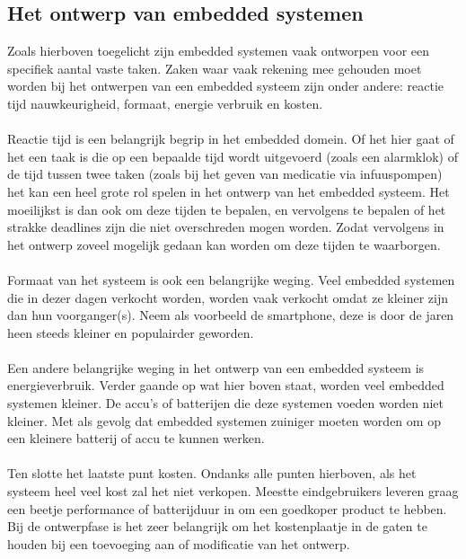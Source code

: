 \documentclass[../DCM2_Verslag.tex]{subfiles}
\begin{document}
\subsection{Het ontwerp van embedded systemen}
Zoals hierboven toegelicht zijn embedded systemen vaak ontworpen voor een specifiek aantal vaste taken. Zaken waar vaak rekening mee gehouden moet worden bij het ontwerpen van een embedded systeem zijn onder andere: reactie tijd nauwkeurigheid, formaat, energie verbruik en kosten. 
\\\\
Reactie tijd is een belangrijk begrip in het embedded domein. Of het hier gaat of het een taak is die op een bepaalde tijd wordt uitgevoerd (zoals een alarmklok) of de tijd tussen twee taken (zoals bij het geven van medicatie via infuuspompen) het kan een heel grote rol spelen in het ontwerp van het embedded systeem. Het moeilijkst is dan ook om deze tijden te bepalen, en vervolgens te bepalen of het strakke deadlines zijn die niet overschreden mogen worden. Zodat vervolgens in het ontwerp zoveel mogelijk gedaan kan worden om deze tijden te waarborgen. 
\\\\
Formaat van het systeem is ook een belangrijke weging. Veel embedded systemen die in dezer dagen verkocht worden, worden vaak verkocht omdat ze kleiner zijn dan hun voorganger(s). Neem als voorbeeld de smartphone, deze is door de jaren heen steeds kleiner en populairder geworden.
\\\\
Een andere belangrijke weging in het ontwerp van een embedded systeem is energieverbruik. 
Verder gaande op wat hier boven staat, worden veel embedded systemen kleiner. De accu's of batterijen die deze systemen voeden worden niet kleiner. Met als gevolg dat embedded systemen zuiniger moeten worden om op een kleinere batterij of accu te kunnen werken.
\\\\
Ten slotte het laatste punt kosten. Ondanks alle punten hierboven, als het systeem heel veel kost zal het niet verkopen. Meestte eindgebruikers leveren graag een beetje performance of batterijduur in om een goedkoper product te hebben. Bij de ontwerpfase is het zeer belangrijk om het kostenplaatje in de gaten te houden bij een toevoeging aan of modificatie van het ontwerp.
\end{document}
